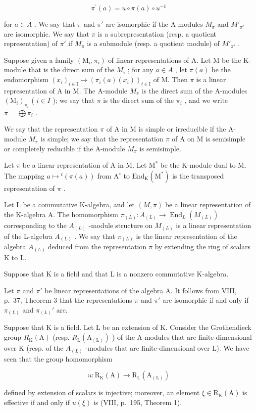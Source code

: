\[
\pi^ {\prime} (a) = u \circ \pi (a) \circ u ^ {- 1}\tag{2}
\]

for \(a \in A\) . We say that \(\pi\) and \(\pi'\) are isomorphic if the A-modules \(M_{\pi}\) and \(M'_{\pi'}\) are isomorphic. We say that \(\pi\) is a subrepresentation (resp. a quotient representation) of \(\pi'\) if \(M_{\pi}\) is a submodule (resp. a quotient module) of \(M'_{\pi'}\) .

Suppose given a family \((\mathrm{M}_{i},\pi_{i})\) of linear representations of A. Let M be the K-module that is the direct sum of the \(M_{i}\) ; for any \(a\in A\) , let \(\pi(a)\) be the endomorphism \((x_{i})_{i\in\mathrm{I}}\mapsto(\pi_{i}(a)(x_{i}))_{i\in\mathrm{I}}\) of M. Then \(\pi\) is a linear representation of A in M. The A-module \(M_{\pi}\) is the direct sum of the A-modules \((\mathrm{M}_{i})_{\pi_{i}}\) ( \(i\in I\) ); we say that \(\pi\) is the direct sum of the \(\pi_{i}\) , and we write \(\pi=\bigoplus\pi_{i}\) .

We say that the representation \(\pi\) of A in M is simple or irreducible if the A-module \(M_{\pi}\) is simple; we say that the representation \(\pi\) of A on M is semisimple or completely reducible if the A-module \(M_{\pi}\) is semisimple.

Let \(\pi\) be a linear representation of A in M. Let \(\mathrm{M}^*\) be the K-module dual to M. The mapping \(a\mapsto{}^{t}(\pi (a))\) from \(\mathrm{A}^{\circ}\) to \(\mathrm{End}_{\mathrm{K}}(\mathrm{M}^{*})\) is the transposed representation of \(\pi\) .

Let L be a commutative K-algebra, and let \((M,\pi)\) be a linear representation of the K-algebra A. The homomorphism \(\pi_{(L)}:A_{(L)}\to\operatorname{End}_{L}(M_{(L)})\) corresponding to the \(A_{(L)}\) -module structure on \(M_{(L)}\) is a linear representation of the L-algebra \(A_{(L)}\) . We say that \(\pi_{(L)}\) is the linear representation of the algebra \(A_{(L)}\) deduced from the representation \(\pi\) by extending the ring of scalars K to L.

Suppose that K is a field and that L is a nonzero commutative K-algebra.

Let \(\pi\) and \(\pi'\) be linear representations of the algebra A. It follows from VIII, p.~37, Theorem 3 that the representations \(\pi\) and \(\pi'\) are isomorphic if and only if \(\pi_{(L)}\) and \(\pi_{(L)}'\) are.

Suppose that K is a field. Let L be an extension of K. Consider the Grothendieck group \(R_{\mathrm{K}}(\mathrm{A})\) (resp. \(R_{\mathrm{L}}(\mathrm{A}_{(\mathrm{L})})\) ) of the A-modules that are finite-dimensional over K (resp. of the \(A_{(L)}\) -modules that are finite-dimensional over L). We have seen that the group homomorphism

\[
u: \mathrm{R} _ {\mathrm{K}} (\mathrm{A}) \longrightarrow \mathrm{R} _ {\mathrm{L}} (\mathrm{A} _ {(\mathrm{L})})
\]

defined by extension of scalars is injective; moreover, an element \(\xi \in \mathrm{R}_{\mathrm{K}}(\mathrm{A})\) is effective if and only if \(u(\xi)\) is (VIII, p.~195, Theorem 1).

